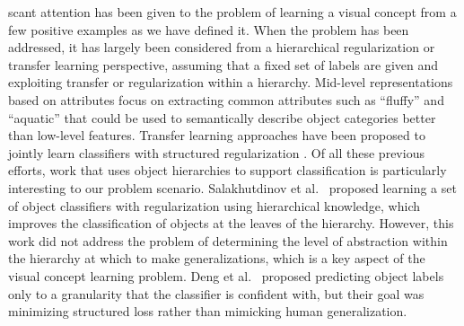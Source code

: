 scant attention has been given to the problem of learning a visual concept from a few positive examples as we have defined it. When the problem has been
addressed, it has largely been considered from a hierarchical regularization
\cite{salakhutdinov2011learning} or transfer learning
\cite{quattoni2008transfer} perspective, assuming that a fixed
set of labels are given and exploiting transfer or regularization within a
hierarchy. Mid-level representations based on attributes
\cite{farhadi2009describing,parikh2011relative} focus on extracting common
attributes such as ``fluffy'' and ``aquatic'' that could be used to
semantically describe object categories better than low-level
features. Transfer learning approaches have been proposed to jointly learn
classifiers with structured regularization \cite{quattoni2008transfer}. Of all these previous efforts, work
that uses object hierarchies to support classification is particularly interesting to our problem scenario. Salakhutdinov et
al.~\cite{salakhutdinov2011learning} proposed learning a set of object
classifiers with regularization using hierarchical knowledge, which
improves the classification of objects at the leaves of the hierarchy.
However, this work did not address the problem of determining the level of
abstraction within the hierarchy at which to make generalizations, which
is a key aspect of the visual concept learning problem. Deng et
al.~\cite{deng2012hedging} proposed predicting object labels only to a
granularity that the classifier is confident with, but their goal
was minimizing structured loss rather than mimicking human generalization.

